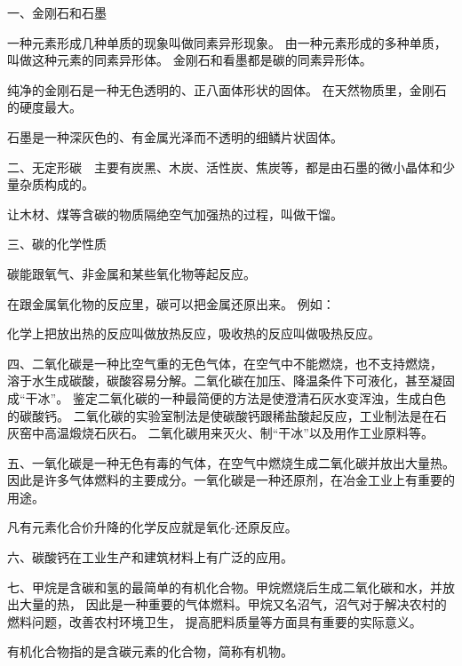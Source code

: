 \xiaojie

一、金刚石和石墨

一种元素形成几种单质的现象叫做同素异形现象。
由一种元素形成的多种单质，叫做这种元素的同素异形体。
金刚石和看墨都是碳的同素异形体。

纯净的金刚石是一种无色透明的、正八面体形状的固体。
在天然物质里，金刚石的硬度最大。

石墨是一种深灰色的、有金属光泽而不透明的细鳞片状固体。


二、无定形碳　主要有炭黑、木炭、活性炭、焦炭等，都是由石墨的微小晶体和少量杂质构成的。

让木材、煤等含碳的物质隔绝空气加强热的过程，叫做干馏。


三、碳的化学性质

碳能跟氧气、非金属和某些氧化物等起反应。

在跟金属氧化物的反应里，碳可以把金属还原出来。
例如： 

化学上把放出热的反应叫做放热反应，吸收热的反应叫做吸热反应。


四、二氧化碳是一种比空气重的无色气体，在空气中不能燃烧，也不支持燃烧，
溶于水生成碳酸，碳酸容易分解。二氧化碳在加压、降温条件下可液化，甚至凝固成“干冰”。
鉴定二氧化碳的一种最简便的方法是使澄清石灰水变浑浊，生成白色的碳酸钙。
二氧化碳的实验室制法是使碳酸钙跟稀盐酸起反应，工业制法是在石灰窑中高温煅烧石灰石。
二氧化碳用来灭火、制“干冰”以及用作工业原料等。


五、一氧化碳是一种无色有毒的气体，在空气中燃烧生成二氧化碳并放出大量热。
因此是许多气体燃料的主要成分。一氧化碳是一种还原剂，在冶金工业上有重要的用途。

凡有元素化合价升降的化学反应就是氧化-还原反应。


六、碳酸钙在工业生产和建筑材料上有广泛的应用。


七、甲烷是含碳和氢的最简单的有机化合物。甲烷燃烧后生成二氧化碳和水，并放出大量的热，
因此是一种重要的气体燃料。甲烷又名沼气，沼气对于解决农村的燃料问题，改善农村环境卫生，
提高肥料质量等方面具有重要的实际意义。

有机化合物指的是含碳元素的化合物，简称有机物。

